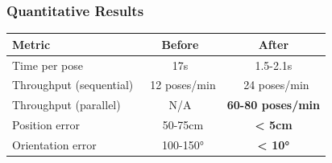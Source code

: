 \documentclass[serif, aspectratio=169, 9pt]{beamer}
\begin{document}
\begin{frame}
\frametitle{Quantitative Results}
    \begin{center}
    \begin{tabular}{|l|c|c|}
    \hline
    \textbf{Metric} & \textbf{Before} & \textbf{After} \\
    \hline
    Time per pose & 17s & 1.5-2.1s \\
    Throughput (sequential) & ~12 poses/min & ~24 poses/min \\
    Throughput (parallel) & N/A & \textbf{60-80 poses/min} \\
    \hline
    Position error & ~50-75cm & \textbf{< 5cm} \\
    Orientation error & ~100-150° & \textbf{< 10°} \\

\end{tabular}
\end{center}
\end{frame}
\end{document}
